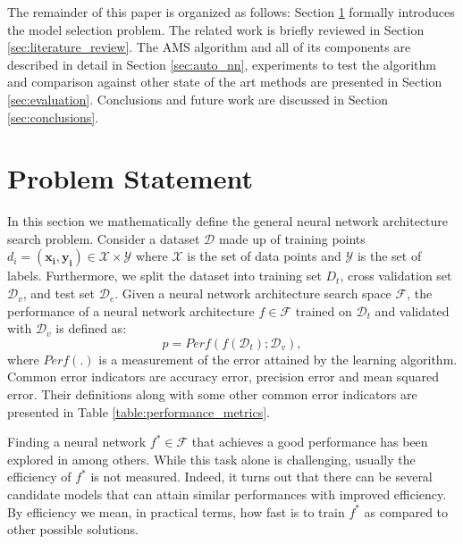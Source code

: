 \documentclass[12pt]{elsart}%
\begin{document}
The remainder of this paper is organized as follows: Section \ref{sec:model_selection} formally introduces the model selection problem. The related work is briefly reviewed in Section \ref{sec:literature_review}. The AMS algorithm and all of its components are described in detail in Section \ref{sec:auto_nn}, experiments to test the algorithm and comparison against other state of the art methods are presented in Section \ref{sec:evaluation}. Conclusions and future work are discussed in Section \ref{sec:conclusions}.


\section{Problem Statement}
\label{sec:model_selection}

In this section we mathematically define the general neural network architecture search problem. Consider a dataset $\mathcal{D}$ made up of training points $d_i = (\mathbf{x_i}, \mathbf{y_i}) \in \mathcal{X} \times \mathcal{Y}$ where $\mathcal{X}$ is the set of data points and $\mathcal{Y}$ is the set of labels. Furthermore, we split the dataset into training set $D_t$, cross validation set $\mathcal{D}_v$, and test set $\mathcal{D}_e$. Given a neural network architecture search space $\mathcal{F}$, the performance of a neural network architecture $f \in \mathcal{F}$ trained on $\mathcal{D}_t$ and validated with  $\mathcal{D}_v$ is defined as:
\begin{equation}
p = {Perf}(f(\mathcal{D}_t); \mathcal{D}_v),
\label{eq:nn_cost}
\end{equation}
where ${Perf}(.)$ is a measurement of the error attained by the learning algorithm. Common error indicators are accuracy error, precision error and mean squared error. Their definitions along with some other common error indicators are presented in Table \ref{table:performance_metrics}. 

Finding a neural network $f^* \in \mathcal{F}$ that achieves a good performance has been explored in \cite{Jin2018,Real2018} among others. While this task alone is challenging, usually the efficiency of $f^*$ is not measured. Indeed, it turns out that there can be several candidate models that can attain similar performances with improved efficiency. By efficiency we mean, in practical terms, how fast is to train $f^*$ as compared to other possible solutions. 
\end{document}
